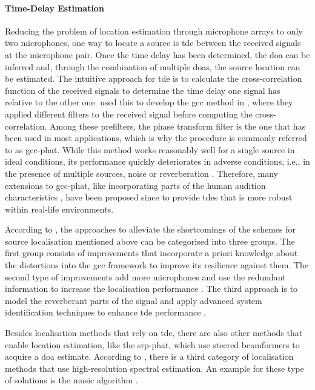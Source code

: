\paragraph{Time-Delay Estimation}
Reducing the problem of location estimation through microphone arrays to only two microphones, one way to locate a source is \gls{tde} between the received signals at the microphone pair. Once the time delay has been determined, the \gls{doa} can be inferred and, through the combination of multiple \glspl{doa}, the source location can be estimated. The intuitive approach for \gls{tde} is to calculate the cross-correlation function of the received signals to determine the time delay one signal has relative to the other one. \citeauthor{Knapp1976} used this to develop the \gls{gcc} method in \cite{Knapp1976}, where they applied different filters to the received signal before computing the cross-correlation. Among these prefilters, the phase transform filter is the one that has been used in most applications, which is why the procedure is commonly referred to as \gls{gcc-phat}. While this method works reasonably well for a single source in ideal conditions, its performance quickly deteriorates in adverse conditions, i.e., in the presence of multiple sources, noise or reverberation \cite{Bedard1994,Champagne1996}. Therefore, many extensions to \gls{gcc-phat}, like incorporating parts of the human audition characteristics \cite{Wilson2006}, have been proposed since to provide \glspl{tde} that is more robust within real-life environments.
 
According to \cite{Chen2006}, the approaches to alleviate the shortcomings of the schemes for source localisation mentioned above can be categorised into three groups. The first group consists of improvements that incorporate a priori knowledge about the distortions into the \gls{gcc} framework to improve its resilience against them. The second type of improvements add more microphones and use the redundant information to increase the localisation performance \cite{Brandstein1996,Silverman1997}. The third approach is to model the reverberant parts of the signal and apply advanced system identification techniques to enhance \gls{tde} performance \cite{Huang1999}.

Besides localisation methods that rely on \gls{tde}, there are also other methods that enable location estimation, like the \gls{srp-phat}, which use steered beamformers to acquire a \gls{doa} estimate. According to \cite{DiBiase2001}, there is a third category of localisation methods that use high-resolution spectral estimation. An example for these type of solutions is the \gls{music} algorithm \cite{Schmidt1986}.

